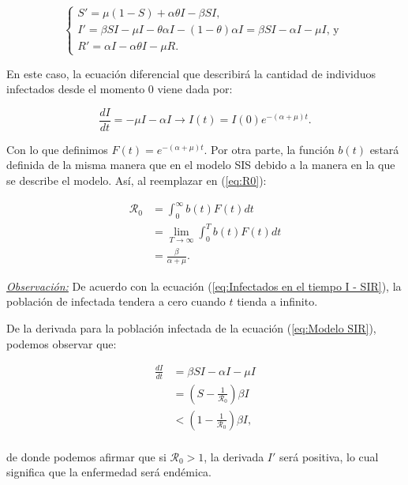 \begin{equation}\label{eq:Modelo SIR}
\left\{
\begin{array}{l}
S' = \mu(1 - S) + \alpha\theta I - \beta S I, \\
I' = \beta S I - \mu I - \theta\alpha I - (1 - \theta)\alpha I = \beta S I - \alpha I - \mu I\text{, y } \\
R' = \alpha I - \alpha\theta I - \mu R.
\end{array}
\right.
\end{equation}

En este caso, la ecuación diferencial que describirá la cantidad de individuos infectados desde el momento 0 viene dada por:

\begin{equation}\label{eq:Infectados en el tiempo I - SIR}
    \frac{dI}{dt}=-\mu I - \alpha I \longrightarrow I(t)=I(0)e^{-(\alpha+\mu)t}.
\end{equation}

Con lo que definimos $F(t)=e^{-(\alpha+\mu)t}$. Por otra parte, la función $b(t)$ estará definida de la misma manera que en el modelo SIS debido a la manera en la que se describe el modelo. Así, al reemplazar en (\ref{eq:R0}):

\begin{align*}
\mathcal{R}_0 &= \int_0^\infty b(t)F(t) dt \\
&= \lim_{T\to\infty} \int_0^T b(t)F(t) dt \\
&= \frac{\beta}{\alpha+\mu}.
\end{align*}

\underline{\textit{Observación:}} De acuerdo con la ecuación (\ref{eq:Infectados en el tiempo I - SIR}), la población de infectada tendera a cero cuando $t$ tienda a infinito.

De la derivada para la población infectada de la ecuación (\ref{eq:Modelo SIR}), podemos observar que:

\begin{align*}
    \frac{dI}{dt} &= \beta SI - \alpha I - \mu I \\
    &= \left(S-\frac{1}{\mathcal{R}_0}\right)\beta I \\
    &< \left(1-\frac{1}{\mathcal{R}_0}\right)\beta I, \\
\end{align*}

de donde podemos afirmar que si $\mathcal{R}_0>1$, la derivada $I'$ será positiva, lo cual significa que la enfermedad será endémica.

